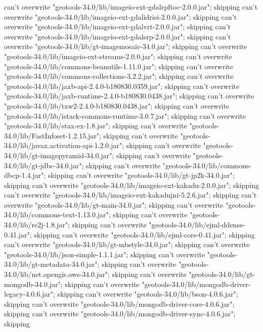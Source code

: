     can't overwrite "geotools-34.0/lib/imageio-ext-gdalrpftoc-2.0.0.jar"; skipping
    can't overwrite "geotools-34.0/lib/imageio-ext-gdalidrisi-2.0.0.jar"; skipping
    can't overwrite "geotools-34.0/lib/imageio-ext-gdalvrt-2.0.0.jar"; skipping
    can't overwrite "geotools-34.0/lib/imageio-ext-gdalsrp-2.0.0.jar"; skipping
    can't overwrite "geotools-34.0/lib/gt-imagemosaic-34.0.jar"; skipping
    can't overwrite "geotools-34.0/lib/imageio-ext-streams-2.0.0.jar"; skipping
    can't overwrite "geotools-34.0/lib/commons-beanutils-1.11.0.jar"; skipping
    can't overwrite "geotools-34.0/lib/commons-collections-3.2.2.jar"; skipping
    can't overwrite "geotools-34.0/lib/jaxb-api-2.4.0-b180830.0359.jar"; skipping
    can't overwrite "geotools-34.0/lib/jaxb-runtime-2.4.0-b180830.0438.jar"; skipping
    can't overwrite "geotools-34.0/lib/txw2-2.4.0-b180830.0438.jar"; skipping
    can't overwrite "geotools-34.0/lib/istack-commons-runtime-3.0.7.jar"; skipping
    can't overwrite "geotools-34.0/lib/stax-ex-1.8.jar"; skipping
    can't overwrite "geotools-34.0/lib/FastInfoset-1.2.15.jar"; skipping
    can't overwrite "geotools-34.0/lib/javax.activation-api-1.2.0.jar"; skipping
    can't overwrite "geotools-34.0/lib/gt-imagepyramid-34.0.jar"; skipping
    can't overwrite "geotools-34.0/lib/gt-jdbc-34.0.jar"; skipping
    can't overwrite "geotools-34.0/lib/commons-dbcp-1.4.jar"; skipping
    can't overwrite "geotools-34.0/lib/gt-jp2k-34.0.jar"; skipping
    can't overwrite "geotools-34.0/lib/imageio-ext-kakadu-2.0.0.jar"; skipping
    can't overwrite "geotools-34.0/lib/imageio-ext-kakadujni-5.2.6.jar"; skipping
    can't overwrite "geotools-34.0/lib/gt-main-34.0.jar"; skipping
    can't overwrite "geotools-34.0/lib/commons-text-1.13.0.jar"; skipping
    can't overwrite "geotools-34.0/lib/re2j-1.8.jar"; skipping
    can't overwrite "geotools-34.0/lib/ejml-ddense-0.41.jar"; skipping
    can't overwrite "geotools-34.0/lib/ejml-core-0.41.jar"; skipping
    can't overwrite "geotools-34.0/lib/gt-mbstyle-34.0.jar"; skipping
    can't overwrite "geotools-34.0/lib/json-simple-1.1.1.jar"; skipping
    can't overwrite "geotools-34.0/lib/gt-metadata-34.0.jar"; skipping
    can't overwrite "geotools-34.0/lib/net.opengis.ows-34.0.jar"; skipping
    can't overwrite "geotools-34.0/lib/gt-mongodb-34.0.jar"; skipping
    can't overwrite "geotools-34.0/lib/mongodb-driver-legacy-4.0.6.jar"; skipping
    can't overwrite "geotools-34.0/lib/bson-4.0.6.jar"; skipping
    can't overwrite "geotools-34.0/lib/mongodb-driver-core-4.0.6.jar"; skipping
    can't overwrite "geotools-34.0/lib/mongodb-driver-sync-4.0.6.jar"; skipping
